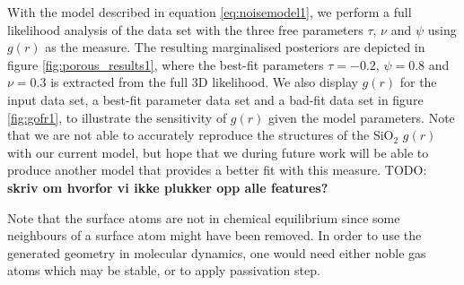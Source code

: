 \documentclass[aps,pre,twocolumn,letterpaper,floatfix,showpacs]{revtex4}
\newcommand{\todo}[1]{ {\color{Magenta} TODO: \color{Blue} \textbf{#1} }}
\begin{document}
With the model described in equation \ref{eq:noisemodel1}, we perform a full likelihood analysis of the data set with the three free parameters $\tau$, $\nu$ and $\psi$ using $g(r)$ as the measure. 
The resulting marginalised posteriors are depicted in figure \ref{fig:porous_results1}, where the best-fit parameters $\tau=-0.2$, $\psi=0.8$ and $\nu=0.3$ is extracted from the full 3D likelihood. 
We also display $g(r)$ for the input data set, a best-fit parameter data set and a bad-fit data set in figure \ref{fig:gofr1}, to illustrate the sensitivity of $g(r)$ given the model parameters. 
Note that we are not able to accurately reproduce the structures of the SiO$_2$ $g(r)$ with our current model, but hope that we during future work will be able to produce another model that provides a better fit with this measure. 
\todo{skriv om hvorfor vi ikke plukker opp alle features?}

Note that the surface atoms are not in chemical equilibrium since some neighbours of a surface atom might have been removed. 
In order to use the generated geometry in molecular dynamics, one would need either noble gas atoms which may be stable, or to apply passivation step.
\end{document}
